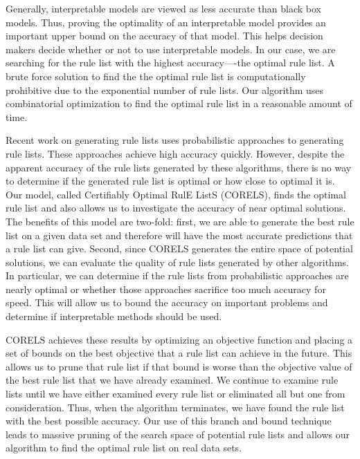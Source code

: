 Generally, interpretable models are viewed as less accurate than black box models.
Thus, proving the optimality of an interpretable model provides an important upper bound on the accuracy of that model.
This helps decision makers decide whether or not to use interpretable models.
In our case, we are searching for the rule list with the highest accuracy----the optimal rule list. 
A brute force solution to find the the optimal rule list is computationally prohibitive due to the exponential number of rule lists.
Our algorithm uses combinatorial optimization to find the optimal rule list in a reasonable amount of time.

Recent work on generating rule lists \cite{LethamRuMcMa15,YangRuSe16} uses probabilistic approaches to generating rule lists.
These approaches achieve high accuracy quickly.
However, despite the apparent accuracy of the rule lists generated by these algorithms, there is no way to determine if the generated rule list is optimal or how close to optimal it is. 
Our model, called Certifiably Optimal RulE ListS (CORELS), finds the optimal rule list and also allows us to investigate the accuracy of near optimal solutions. 
The benefits of this model are two-fold: first, we are able to generate the best rule list on a given data set and therefore will have the most accurate predictions that a rule list can give.
Second, since CORELS generates the entire space of potential solutions, we can evaluate the quality of rule lists generated by other algorithms. 
In particular, we can determine if the rule lists from probabilistic approaches are nearly optimal or whether those approaches sacrifice too much accuracy for speed.
This will allow us to bound the accuracy on important problems and determine if interpretable methods should be used.

CORELS achieves these results by optimizing an objective function and placing a set of bounds on the best objective that a rule list can achieve in the future. 
This allows us to prune that rule list if that bound is worse than the objective value of the best rule list that we have already examined.
We continue to examine rule lists until we have either examined every rule list or eliminated all but one from consideration. 
Thus, when the algorithm terminates, we have found the rule list with the best possible accuracy. 
Our use of this branch and bound technique leads to massive pruning of the search space of potential rule lists and allows our algorithm to find the optimal rule list on real data sets.

